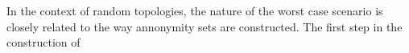 \documentclass[../thesis]{subfiles}
\begin{document}
In the context of random topologies, the nature of the worst case scenario is closely related to the way annonymity sets are constructed. The first step in the construction of 
\end{document}
